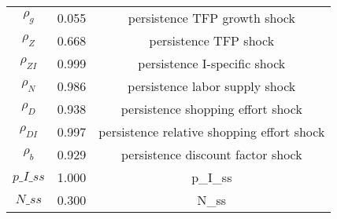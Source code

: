 \begin{center}
\begin{longtable}{ccc}
${\rho_g}$ 	 & 	 0.055 	 & 	 persistence TFP growth shock\\
${\rho_Z}$ 	 & 	 0.668 	 & 	 persistence TFP shock\\
${\rho_{ZI}}$ 	 & 	 0.999 	 & 	 persistence I-specific shock\\
${\rho_N}$ 	 & 	 0.986 	 & 	 persistence labor supply shock\\
${\rho_D}$ 	 & 	 0.938 	 & 	 persistence shopping effort shock\\
${\rho_{DI}}$ 	 & 	 0.997 	 & 	 persistence relative shopping effort shock\\
${\rho_b}$ 	 & 	 0.929 	 & 	 persistence discount factor shock\\
$p\_I\_ss$ 	 & 	 1.000 	 & 	 p\_I\_ss\\
$N\_ss$ 	 & 	 0.300 	 & 	 N\_ss\\
\bottomrule%
\end{longtable}
\end{center}
